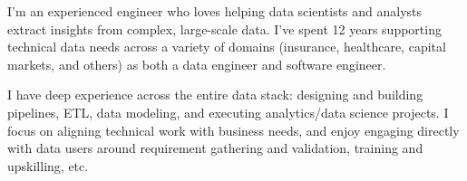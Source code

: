 

\begin{cvparagraph}


I'm an experienced engineer who loves helping data scientists and analysts extract insights from complex, large-scale data. I've spent 12 years supporting technical data needs across a variety of domains (insurance, healthcare, capital markets, and others) as both a data engineer and software engineer.

I have deep experience across the entire data stack: designing and building pipelines, ETL, data modeling, and executing analytics/data science projects. I focus on aligning technical work with business needs, and enjoy engaging directly with data users around requirement gathering and validation, training and upskilling, etc.

\end{cvparagraph}
